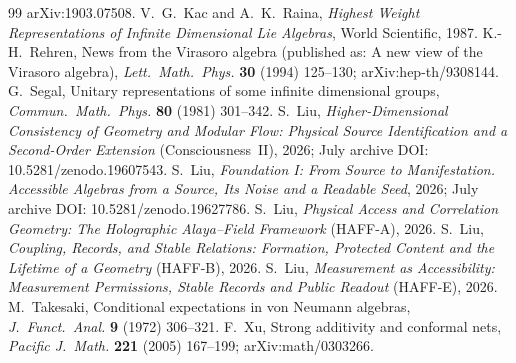 \documentclass[12pt]{article}
\theoremstyle{definition}
\theoremstyle{remark}
\begin{document}
\begin{thebibliography}{99}
arXiv:1903.07508.
 V.~G.~Kac and A.~K.~Raina, \emph{Highest Weight Representations of Infinite Dimensional Lie Algebras}, World Scientific, 1987.
 K.-H.~Rehren, News from the Virasoro algebra (published as: A new view of
the Virasoro algebra), \emph{Lett.\ Math.\ Phys.} \textbf{30} (1994) 125--130;
arXiv:hep-th/9308144.
 G.~Segal, Unitary representations of some infinite dimensional groups, \emph{Commun.\ Math.\ Phys.} \textbf{80} (1981) 301--342.
 S.~Liu, \emph{Higher-Dimensional Consistency of Geometry and Modular Flow: Physical Source Identification and a Second-Order Extension} (Consciousness~II), 2026;
July archive DOI: 10.5281/zenodo.19607543.
 S.~Liu, \emph{Foundation I: From Source to Manifestation.
Accessible Algebras from a Source, Its Noise and a Readable Seed},
2026; July archive DOI: 10.5281/zenodo.19627786.
 S.~Liu, \emph{Physical Access and Correlation Geometry:
The Holographic Alaya--Field Framework} (HAFF-A), 2026.
 S.~Liu, \emph{Coupling, Records, and Stable Relations:
Formation, Protected Content and the Lifetime of a Geometry} (HAFF-B),
2026.
 S.~Liu, \emph{Measurement as Accessibility:
Measurement Permissions, Stable Records and Public Readout} (HAFF-E),
2026.
 M.~Takesaki, Conditional expectations in von Neumann algebras, \emph{J.\ Funct.\ Anal.} \textbf{9} (1972) 306--321.
 F.~Xu, Strong additivity and conformal nets, \emph{Pacific J.\ Math.}
\textbf{221} (2005) 167--199; arXiv:math/0303266.

\end{thebibliography}
\end{document}
